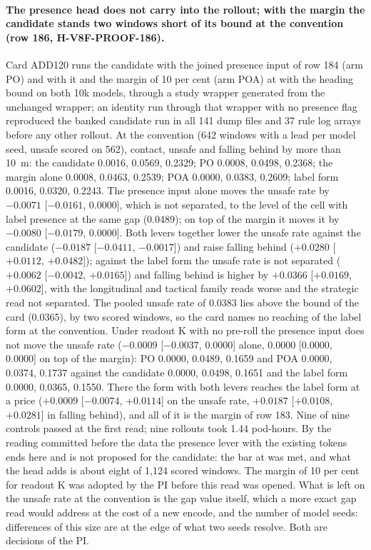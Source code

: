 \paragraph{The presence head does not carry into the rollout; with the margin the candidate stands two windows short of its bound at the convention (row 186, H-V8F-PROOF-186).} Card ADD120 runs the candidate with the joined presence input of row 184 (arm PO) and with it and the margin of 10 per cent (arm POA) at  with the heading bound on both 10k models, through a study wrapper generated from the unchanged wrapper; an identity run through that wrapper with no presence flag reproduced the banked candidate run in all 141 dump files and 37 rule log arrays before any other rollout. At the convention (642 windows with a lead per model seed, unsafe scored on 562), contact, unsafe and falling behind by more than 10~m: the candidate 0.0016, 0.0569, 0.2329; PO 0.0008, 0.0498, 0.2368; the margin alone 0.0008, 0.0463, 0.2539; POA 0.0000, 0.0383, 0.2609; label form 0.0016, 0.0320, 0.2243. The presence input alone moves the unsafe rate by $-0.0071$ [$-0.0161$, 0.0000], which is not separated, to the level of the cell with label presence at the same gap (0.0489); on top of the margin it moves it by $-0.0080$ [$-0.0179$, 0.0000]. Both levers together lower the unsafe rate against the candidate ($-0.0187$ [$-0.0411$, $-0.0017$]) and raise falling behind ($+0.0280$ [$+0.0112$, $+0.0482$]); against the label form the unsafe rate is not separated ($+0.0062$ [$-0.0042$, $+0.0165$]) and falling behind is higher by $+0.0366$ [$+0.0169$, $+0.0602$], with the longitudinal and tactical family reads worse and the strategic read not separated. The pooled unsafe rate of 0.0383 lies above the bound of the card (0.0365), by two scored windows, so the card names no reaching of the label form at the convention. Under readout K with no pre-roll the presence input does not move the unsafe rate ($-0.0009$ [$-0.0037$, 0.0000] alone, 0.0000 [0.0000, 0.0000] on top of the margin): PO 0.0000, 0.0489, 0.1659 and POA 0.0000, 0.0374, 0.1737 against the candidate 0.0000, 0.0498, 0.1651 and the label form 0.0000, 0.0365, 0.1550. There the form with both levers reaches the label form at a price ($+0.0009$ [$-0.0074$, $+0.0114$] on the unsafe rate, $+0.0187$ [$+0.0108$, $+0.0281$] in falling behind), and all of it is the margin of row 183. Nine of nine controls passed at the first read; nine rollouts took 1.44 pod-hours. By the reading committed before the data the presence lever with the existing tokens ends here and is not proposed for the candidate: the bar at  was met, and what the head adds is about eight of 1,124 scored windows. The margin of 10 per cent for readout K was adopted by the PI before this read was opened. What is left on the unsafe rate at the convention is the gap value itself, which a more exact gap read would address at the cost of a new encode, and the number of model seeds: differences of this size are at the edge of what two seeds resolve. Both are decisions of the PI.


